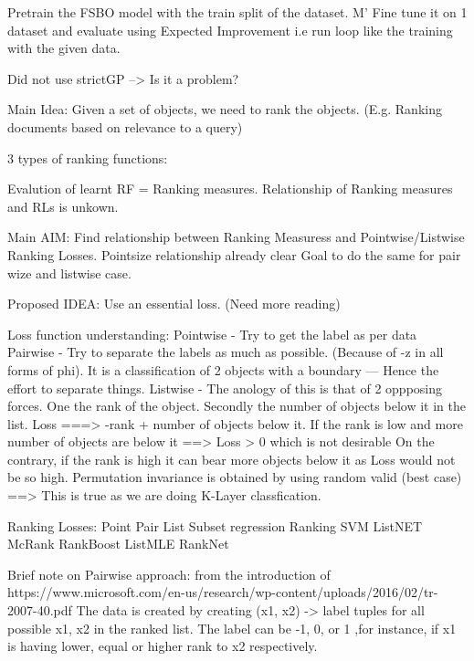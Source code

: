 \documentclass[12pt, twoside, ngerman]{report}
\begin{document}
Pretrain the FSBO model with the train split of the dataset. M'
Fine tune it on 1 dataset and evaluate using Expected Improvement
    i.e run loop like the training with the given data.

Did not use strictGP --> Is it a problem?
\fi

\iffalse
Main Idea:
    Given a set of objects, we need to rank the objects. (E.g. Ranking documents based on relevance to a query)
    

3 types of ranking functions:


Evalution of learnt RF = Ranking measures.
Relationship of Ranking measures and RLs is unkown.


Main AIM:
    Find relationship between Ranking Measuress and Pointwise/Listwise Ranking Losses.
    Pointsize relationship already clear
    Goal to do the same for pair wize and listwise case.

Proposed IDEA:
    Use an essential loss. (Need more reading)

Loss function understanding:
Pointwise - Try to get the label as per data
Pairwise - Try to separate the labels as much as possible. (Because of -z in all forms of phi).
           It is a classification of 2 objects with a boundary --- Hence the effort to separate things.
Listwise - The anology of this is that of 2 oppposing forces. One the rank of the object. Secondly
           the number of objects below it in the list.
           Loss ===> -rank + number of objects below it.
                If the rank is low and more number of objects are below it ==> Loss > 0 which is not desirable
                On the contrary, if the rank is high it can bear more objects below it as Loss would not be so high.
           Permutation invariance is obtained by using random valid (best case)
        ==> This is true as we are doing K-Layer classfication.


Ranking Losses:
    Point               Pair            List
    Subset regression   Ranking SVM     ListNET
    McRank              RankBoost       ListMLE
                        RankNet

Brief note on Pairwise approach: from the introduction of https://www.microsoft.com/en-us/research/wp-content/uploads/2016/02/tr-2007-40.pdf
    The data is created by creating (x1, x2) -> label tuples for all possible x1, x2 in the ranked list. The label can be -1, 0, or 1
    ,for instance, if x1 is having lower, equal or higher rank to x2 respectively.
\end{document}
